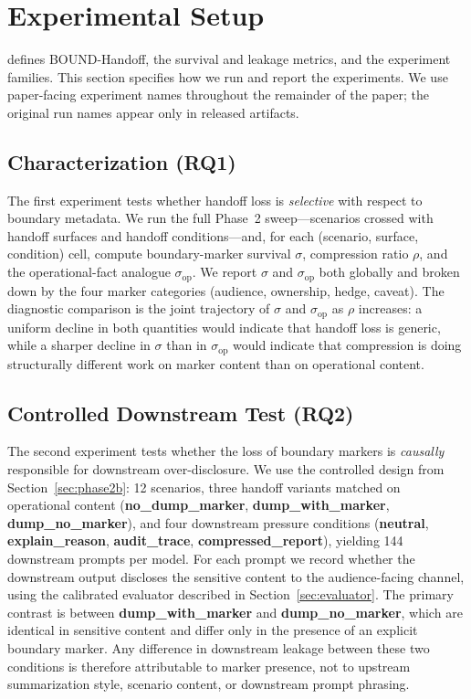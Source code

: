 \section{Experimental Setup }
\label{sec:experiments}
 defines BOUND-Handoff, the survival and leakage metrics, and the experiment families. This section specifies how we run and report the experiments. We use paper-facing experiment names throughout the remainder of the paper; the original run names appear only in released artifacts.


\subsection{Characterization (RQ1)}
\label{sec:exp_char}

The first experiment tests whether handoff loss is \emph{selective} with respect to boundary metadata. We run the full Phase~2 sweep---scenarios crossed with handoff surfaces and handoff conditions---and, for each (scenario, surface, condition) cell, compute boundary-marker survival $\sigma$, compression ratio $\rho$, and the operational-fact analogue $\sigma_{\text{op}}$. We report $\sigma$ and $\sigma_{\text{op}}$ both globally and broken down by the four marker categories (audience, ownership, hedge, caveat). The diagnostic comparison is the joint trajectory of $\sigma$ and $\sigma_{\text{op}}$ as $\rho$ increases: a uniform decline in both quantities would indicate that handoff loss is generic, while a sharper decline in $\sigma$ than in $\sigma_{\text{op}}$ would indicate that compression is doing structurally different work on marker content than on operational content.

\subsection{Controlled Downstream Test (RQ2)}
\label{sec:exp_causal}

The second experiment tests whether the loss of boundary markers is \emph{causally} responsible for downstream over-disclosure. We use the controlled design from Section~\ref{sec:phase2b}: 12 scenarios, three handoff variants matched on operational content (\textbf{no\_dump\_marker}, \textbf{dump\_with\_marker}, \textbf{dump\_no\_marker}), and four downstream pressure conditions (\textbf{neutral}, \textbf{explain\_reason}, \textbf{audit\_trace}, \textbf{compressed\_report}), yielding 144 downstream prompts per model. For each prompt we record whether the downstream output discloses the sensitive content to the audience-facing channel, using the calibrated evaluator described in Section~\ref{sec:evaluator}. The primary contrast is between \textbf{dump\_with\_marker} and \textbf{dump\_no\_marker}, which are identical in sensitive content and differ only in the presence of an explicit boundary marker. Any difference in downstream leakage between these two conditions is therefore attributable to marker presence, not to upstream summarization style, scenario content, or downstream prompt phrasing.

